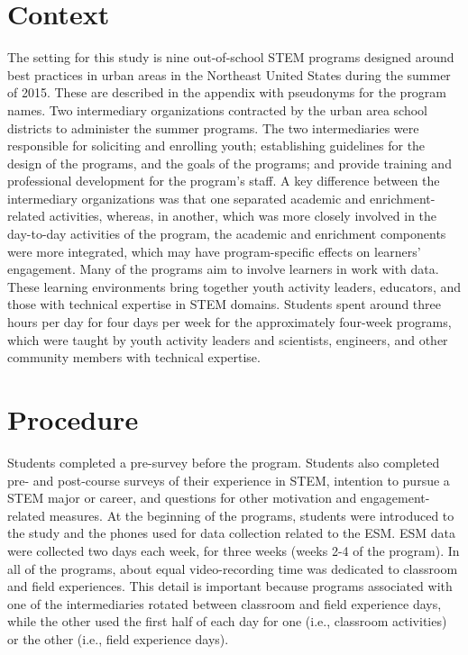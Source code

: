 \documentclass[]{book}
\theoremstyle{definition}
\theoremstyle{definition}
\theoremstyle{definition}
\theoremstyle{remark}
\begin{document}
\section{Context}\label{context}

The setting for this study is nine out-of-school STEM programs designed
around best practices in urban areas in the Northeast United States
during the summer of 2015. These are described in the appendix with
pseudonyms for the program names. Two intermediary organizations
contracted by the urban area school districts to administer the summer
programs. The two intermediaries were responsible for soliciting and
enrolling youth; establishing guidelines for the design of the programs,
and the goals of the programs; and provide training and professional
development for the program's staff. A key difference between the
intermediary organizations was that one separated academic and
enrichment-related activities, whereas, in another, which was more
closely involved in the day-to-day activities of the program, the
academic and enrichment components were more integrated, which may have
program-specific effects on learners' engagement. Many of the programs
aim to involve learners in work with data. These learning environments
bring together youth activity leaders, educators, and those with
technical expertise in STEM domains. Students spent around three hours
per day for four days per week for the approximately four-week programs,
which were taught by youth activity leaders and scientists, engineers,
and other community members with technical expertise.

\section{Procedure}\label{procedure}

Students completed a pre-survey before the program. Students also
completed pre- and post-course surveys of their experience in STEM,
intention to pursue a STEM major or career, and questions for other
motivation and engagement-related measures. At the beginning of the
programs, students were introduced to the study and the phones used for
data collection related to the ESM. ESM data were collected two days
each week, for three weeks (weeks 2-4 of the program). In all of the
programs, about equal video-recording time was dedicated to classroom
and field experiences. This detail is important because programs
associated with one of the intermediaries rotated between classroom and
field experience days, while the other used the first half of each day
for one (i.e., classroom activities) or the other (i.e., field
experience days).
\end{document}
